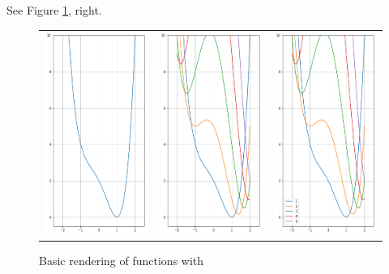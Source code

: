 See Figure \ref{figure:basicplt}, right.

\begin{figure}[ht!]
\begin{tabular}{ccc}
\includegraphics[width=0.33\linewidth]{images/basicplt.png} &
\includegraphics[width=0.33\linewidth]{images/4plotsplt.png} &
\includegraphics[width=0.33\linewidth]{images/4plotslegendplt.png}
\end{tabular}
\caption{Basic rendering of functions with \pyplot}
\label{figure:basicplt}
\end{figure}

